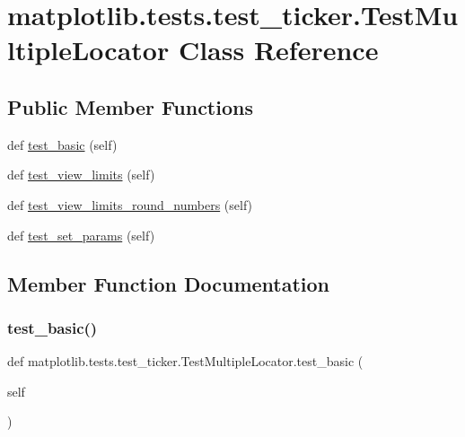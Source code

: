 \hypertarget{classmatplotlib_1_1tests_1_1test__ticker_1_1TestMultipleLocator}{}\section{matplotlib.\+tests.\+test\+\_\+ticker.\+Test\+Multiple\+Locator Class Reference}
\label{classmatplotlib_1_1tests_1_1test__ticker_1_1TestMultipleLocator}
\subsection*{Public Member Functions}
\begin{DoxyCompactItemize}
\item 
def \hyperlink{classmatplotlib_1_1tests_1_1test__ticker_1_1TestMultipleLocator_ae5831173c09d471dee3734237b335bf0}{test\+\_\+basic} (self)
\item 
def \hyperlink{classmatplotlib_1_1tests_1_1test__ticker_1_1TestMultipleLocator_a81b892f069132d1cee0cf4ccb86bb757}{test\+\_\+view\+\_\+limits} (self)
\item 
def \hyperlink{classmatplotlib_1_1tests_1_1test__ticker_1_1TestMultipleLocator_a2a0828691bc2a8d50c6c5e0d8a8c8998}{test\+\_\+view\+\_\+limits\+\_\+round\+\_\+numbers} (self)
\item 
def \hyperlink{classmatplotlib_1_1tests_1_1test__ticker_1_1TestMultipleLocator_a36d2c5abd6600b143186e01f3c2b098d}{test\+\_\+set\+\_\+params} (self)
\end{DoxyCompactItemize}


\subsection{Member Function Documentation}
\mbox{\label{classmatplotlib_1_1tests_1_1test__ticker_1_1TestMultipleLocator_ae5831173c09d471dee3734237b335bf0}} 
\subsubsection{\texorpdfstring{test\+\_\+basic()}{test\_basic()}}
{\footnotesize\ttfamily def matplotlib.\+tests.\+test\+\_\+ticker.\+Test\+Multiple\+Locator.\+test\+\_\+basic (\begin{DoxyParamCaption}\item[{}]{self }\end{DoxyParamCaption})}

